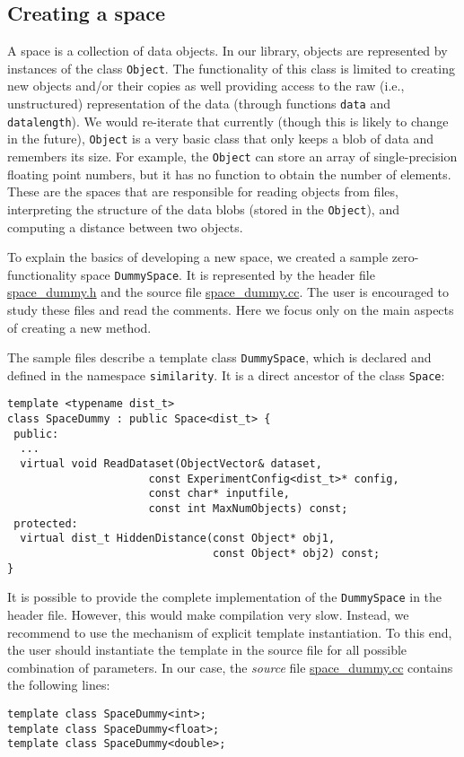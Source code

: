 \documentclass[runningheads,a4paper]{llncs}
\newcommand{\ttt}[1]{\texttt{#1}}
\begin{document}
\subsection{Creating a space}\label{SectionCreateSpace}
A space is a collection of data objects.
In our library, objects are represented by instances
of the class \ttt{Object}.
The functionality of this class is limited to
creating new objects and/or their copies as well providing
access to the raw (i.e., unstructured) representation of the data
(through functions \ttt{data} and \ttt{datalength}).
We would re-iterate that currently (though this is likely to change in the future),
\ttt{Object} is a very basic class that only keeps a blob of data and remembers its size.
For example, the \ttt{Object} can store an array of single-precision floating point
numbers, but it has no function to obtain the number of elements.
These are the spaces that are responsible for reading objects from files,
interpreting the structure of the data blobs (stored in the \ttt{Object}), 
and computing a distance between two objects.


To explain the basics of developing a new space,
we created a sample zero-functionality space \texttt{DummySpace}.
It is represented by 
the header file 
\href{https://github.com/searchivarius/NonMetricSpaceLib/blob/master/similarity_search/include/space/space_dummy.h}{space\_dummy.h}
and the source file
\href{https://github.com/searchivarius/NonMetricSpaceLib/blob/master/similarity_search/src/space/space_dummy.cc}{space\_dummy.cc}.
The user is encouraged to study these files and read the comments.
Here we focus only on the main aspects of creating a new method.
\newpage

The sample files describe a template class \ttt{DummySpace}, 
which is declared and defined in the namespace \ttt{similarity}.
It is a direct ancestor of the class \ttt{Space}:
\begin{verbatim}
template <typename dist_t>
class SpaceDummy : public Space<dist_t> {
 public:
  ...
  virtual void ReadDataset(ObjectVector& dataset,
                      const ExperimentConfig<dist_t>* config,
                      const char* inputfile,
                      const int MaxNumObjects) const;
 protected:
  virtual dist_t HiddenDistance(const Object* obj1, 
                                const Object* obj2) const;
}
\end{verbatim}
It is possible to provide the complete implementation of the \ttt{DummySpace}
in the header file. However, this would make compilation very slow.
Instead, we recommend to use the mechanism of explicit template instantiation.
To this end, the user should instantiate the template in the source file
for all possible combination of parameters.
In our case, the \emph{source} file 
\href{https://github.com/searchivarius/NonMetricSpaceLib/blob/master/similarity_search/src/space/space_dummy.cc}{space\_dummy.cc}
contains the following lines:
\begin{verbatim}
template class SpaceDummy<int>;
template class SpaceDummy<float>;
template class SpaceDummy<double>;
\end{verbatim}
\end{document}
